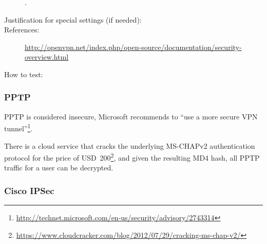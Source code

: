 \begin{description}
\begin{lstlisting}[breaklines]
\end{lstlisting}

. 

\item[Justification for special settings (if needed):]

\item[References:] \url{http://openvpn.net/index.php/open-source/documentation/security-overview.html}

\item[How to test:]


\end{description}


\subsubsection{PPTP}

PPTP is considered insecure, Microsoft recommends to ``use a more secure VPN
tunnel''\footnote{\url{http://technet.microsoft.com/en-us/security/advisory/2743314}}.

There is a cloud service that cracks the underlying MS-CHAPv2
authentication protocol for the price of USD~200\footnote{\url{https://www.cloudcracker.com/blog/2012/07/29/cracking-ms-chap-v2/}},
and given the resulting MD4 hash, all PPTP traffic for a user can
be decrypted.

\subsubsection{Cisco IPSec}

